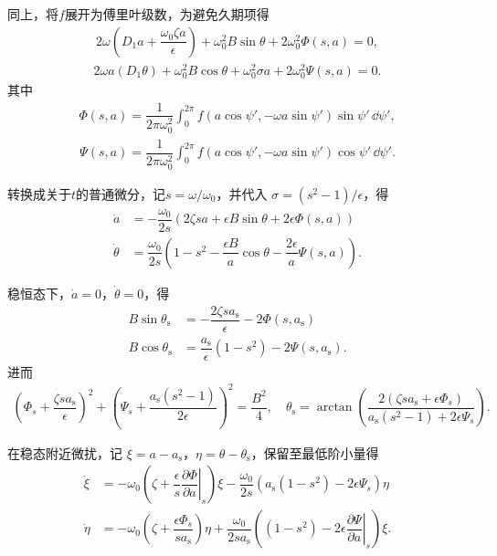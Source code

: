 同上，将\(f\)展开为傅里叶级数，为避免久期项得
\begin{align*}
	2 \omega \left( D_1 a + \dfrac{\omega_0 \zeta a}{\epsilon} \right) + \omega_0^2 B \sin\theta + 2 \omega_0^2 \Phi(s, a) = 0,
\end{align*}
\begin{align*}
	2 \omega a (D_1 \theta) + \omega_0^2 B \cos\theta + \omega_0^2 \sigma a + 2 \omega_0^2 \Psi(s, a) = 0.
\end{align*}
其中
\begin{align*}
	\Phi(s, a) = \dfrac{1}{2 \pi \omega_0^2} \int_0^{2\pi} f(a \cos\psi', -\omega a \sin\psi') \sin\psi' \,\dd \psi',
\end{align*}
\begin{align*}
	\Psi(s, a) = \dfrac{1}{2 \pi \omega_0^2} \int_0^{2\pi} f(a \cos\psi', -\omega a \sin\psi') \cos\psi' \,\dd \psi'.
\end{align*}

转换成关于\(t\)的普通微分，记\(s = \omega/\omega_0\)，并代入 \(\sigma = (s^2 - 1)/\epsilon\)，得
\begin{align*}
	\dot{a} &= -\dfrac{\omega_0}{2 s} \left( 2 \zeta s a + \epsilon B \sin\theta + 2 \epsilon \Phi(s, a) \right)\\
	\dot{\theta} &= \dfrac{\omega_0}{2 s} \left( 1 - s^2 - \dfrac{\epsilon B}{a} \cos\theta - \dfrac{2 \epsilon}{a} \Psi(s, a) \right).
\end{align*}

稳恒态下，\(\dot{a} = 0\)，\(\dot{\theta} = 0\)，得
\begin{align*}
	B \sin\theta_{\mathrm{s}} &= -\dfrac{2 \zeta s a_{\mathrm{s}}}{\epsilon} - 2 \Phi(s, a_{\mathrm{s}})\\
	B \cos\theta_{\mathrm{s}} &= \dfrac{a_{\mathrm{s}}}{\epsilon} (1 - s^2) - 2 \Psi(s, a_{\mathrm{s}}).
\end{align*}
进而
\begin{align*}
	\left( \Phi_s + \dfrac{\zeta s a_{\mathrm{s}}}{\epsilon} \right)^2 + \left( \Psi_s + \dfrac{a_{\mathrm{s}} (s^2 - 1)}{2 \epsilon} \right)^2 = \dfrac{B^2}{4},\quad
	\theta_{\mathrm{s}} = \arctan\left( \dfrac{2 (\zeta s a_{\mathrm{s}} + \epsilon \Phi_s)}{a_{\mathrm{s}} (s^2 - 1) + 2 \epsilon \Psi_s} \right).
\end{align*}

在稳态附近微扰，记 \(\xi = a - a_{\mathrm{s}}\)，\(\eta = \theta - \theta_{\mathrm{s}}\)，保留至最低阶小量得
\begin{align*}
	\dot{\xi} &= -\omega_0 \left( \zeta + \dfrac{\epsilon}{s} \left. \dfrac{\partial \Phi}{\partial a} \right|_s \right) \xi - \dfrac{\omega_0}{2 s} \left( a_{\mathrm{s}} (1 - s^2) - 2 \epsilon \Psi_s \right) \eta\\
	\dot{\eta} &= -\omega_0 \left( \zeta + \dfrac{\epsilon \Phi_s}{s a_{\mathrm{s}}} \right) \eta + \dfrac{\omega_0}{2 s a_{\mathrm{s}}} \left( (1 - s^2) - 2 \epsilon \left. \dfrac{\partial \Psi}{\partial a} \right|_s \right) \xi.
\end{align*}

